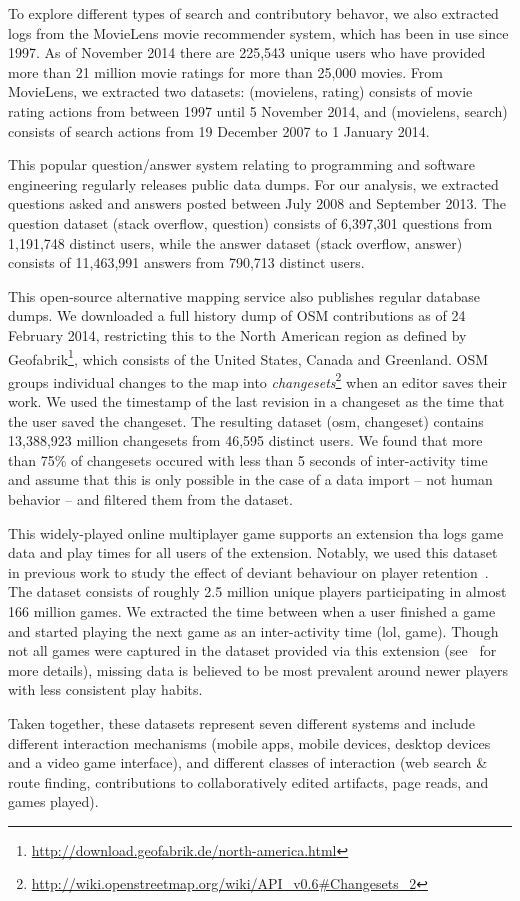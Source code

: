  To explore different types of search and contributory behavor, we also extracted logs from the MovieLens movie recommender system, which has been in use since 1997. As of November 2014 there are 225,543 unique users who have provided more than 21 million movie ratings for more than 25,000 movies. From MovieLens, we extracted two datasets: (movielens, rating) consists of movie rating actions from between 1997 until 5 November 2014, and (movielens, search) consists of search actions from 19 December 2007 to 1 January 2014.

 This popular question/answer system relating to programming and software engineering regularly releases public data dumps. For our analysis, we extracted questions asked and answers posted between July 2008 and September 2013. The question dataset (stack overflow, question) consists of 6,397,301 questions from 1,191,748 distinct users, while the answer dataset (stack overflow, answer) consists of 11,463,991 answers from 790,713 distinct users.

 This open-source alternative mapping service also publishes regular database dumps. We downloaded a full history dump of OSM contributions as of 24 February 2014, restricting this to the North American region as defined by Geofabrik\footnote{\url{http://download.geofabrik.de/north-america.html}}, which consists of the United States, Canada and Greenland. OSM groups individual changes to the map into \textit{changesets}\footnote{\url{http://wiki.openstreetmap.org/wiki/API_v0.6#Changesets_2}} when an editor saves their work. We used the timestamp of the last revision in a changeset as the time that the user saved the changeset. The resulting dataset (osm, changeset) contains 13,388,923 million changesets from 46,595 distinct users.  We found that more than 75\% of changesets occured with less than 5 seconds of inter-activity time and assume that this is only possible in the case of a data import -- not human behavior -- and filtered them from the dataset.

 This widely-played online multiplayer game supports an extension tha logs game data and play times for all users of the extension.  Notably, we used this dataset in previous work to study the effect of deviant behaviour on player retention~\cite{shores2014identification}. The dataset consists of roughly 2.5 million unique players participating in almost 166 million games.  We extracted the time between when a user finished a game and started playing the next game as an inter-activity time (lol, game). Though not all games were captured in the dataset provided via this extension (see~\cite{shores2014identification} for more details), missing data is believed to be most prevalent around newer players with less consistent play habits.

\vskip 10pt
Taken together, these datasets represent seven different systems and include different interaction mechanisms (mobile apps, mobile devices, desktop devices and a video game interface), and different classes of interaction (web search \& route finding, contributions to collaboratively edited artifacts, page reads, and games played).
